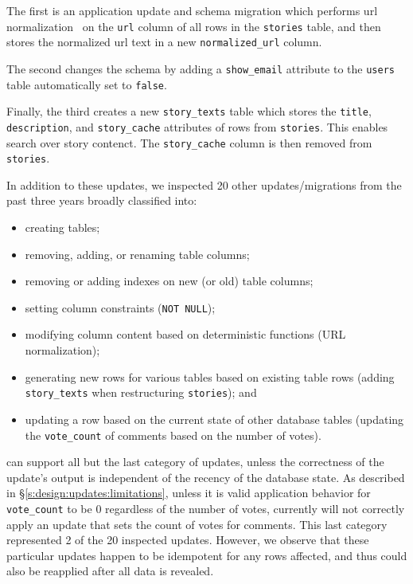 The first is an application update and schema migration which performs url
normalization~\cite{urinorm} on the \texttt{url} column of all rows in the
\texttt{stories} table, and then stores the normalized url text in a new
\texttt{normalized\_url} column.
%

%
The second changes the schema by adding a \texttt{show\_email} attribute to the
\texttt{users} table automatically set to \texttt{false}. 

%
Finally, the third creates a new \texttt{story\_texts} table which stores the
\texttt{title}, \texttt{description}, and \texttt{story\_cache} attributes of
rows from \texttt{stories}. This enables search over story contenct. The
\texttt{story\_cache} column is then removed from \texttt{stories}.

%
In addition to these updates, we inspected 20 other updates/migrations from the past
three years broadly classified into:
\begin{itemize}[nosep]
\item creating tables; 
\item removing, adding, or renaming table columns;
\item removing or adding indexes on new (or old) table columns; 
\item setting column constraints (\eg \texttt{NOT NULL}); 
\item modifying column content based on deterministic functions (\eg URL normalization); 
\item generating new rows for various tables based on existing table rows (\eg adding \texttt{story\_texts}  
when restructuring \texttt{stories}); and
\item updating a row based on the current state of other database tables (\eg updating
the \texttt{vote\_count} of comments based on the number of votes).
\end{itemize}
%
\sys can support all but the last category of updates, unless the correctness of
the update's output is independent of the recency of the database state. As
described in \S\ref{s:design:updates:limitations}, unless it is valid
application behavior for \eg \texttt{vote\_count} to be 0 regardless of the
number of votes, \sys currently will not correctly apply an update that sets the
count of votes for comments.  This last category represented 2 of the 20
inspected updates.  However, we observe that these particular updates happen to
be idempotent for any rows affected, and thus could also be reapplied after all
data is revealed.
%


